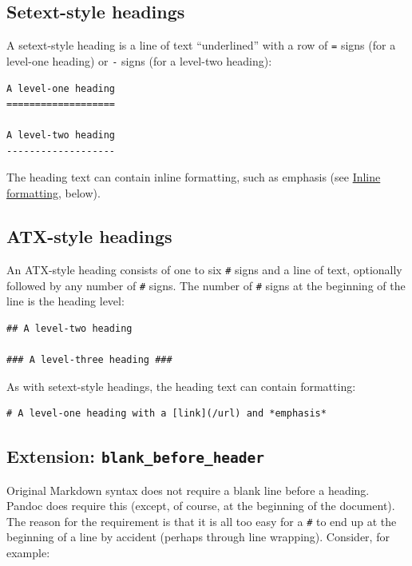 \documentclass[
  b5paper
]{book}
\begin{document}
\subsection{Setext-style headings}\label{setext-style-headings}

A setext-style heading is a line of text ``underlined'' with a row of
\texttt{=} signs (for a level-one heading) or \texttt{-} signs (for a
level-two heading):

\begin{verbatim}
A level-one heading
===================

A level-two heading
-------------------
\end{verbatim}

The heading text can contain inline formatting, such as emphasis (see
\hyperref[inline-formatting]{Inline formatting}, below).

\subsection{ATX-style headings}\label{atx-style-headings}

An ATX-style heading consists of one to six \texttt{\#} signs and a line
of text, optionally followed by any number of \texttt{\#} signs. The
number of \texttt{\#} signs at the beginning of the line is the heading
level:

\begin{verbatim}
## A level-two heading

### A level-three heading ###
\end{verbatim}

As with setext-style headings, the heading text can contain formatting:

\begin{verbatim}
# A level-one heading with a [link](/url) and *emphasis*
\end{verbatim}

\subsection{\texorpdfstring{Extension:
\texttt{blank\_before\_header}}{Extension: blank\_before\_header}}\label{extension-blank_before_header}

Original Markdown syntax does not require a blank line before a heading.
Pandoc does require this (except, of course, at the beginning of the
document). The reason for the requirement is that it is all too easy for
a \texttt{\#} to end up at the beginning of a line by accident (perhaps
through line wrapping). Consider, for example:
\end{document}
